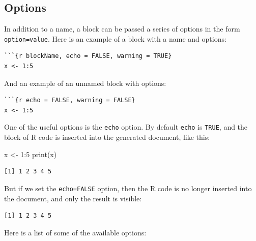 \documentclass[
  letterpaper,
  DIV=11,
  numbers=noendperiod]{scrreprt}
\newenvironment{Shaded}{\begin{snugshade}}{\end{snugshade}}
\newcommand{\DecValTok}[1]{\textcolor[rgb]{0.68,0.00,0.00}{#1}}
\newcommand{\FunctionTok}[1]{\textcolor[rgb]{0.28,0.35,0.67}{#1}}
\newcommand{\NormalTok}[1]{\textcolor[rgb]{0.00,0.23,0.31}{#1}}
\newcommand{\OtherTok}[1]{\textcolor[rgb]{0.00,0.23,0.31}{#1}}
\newcommand{\SpecialCharTok}[1]{\textcolor[rgb]{0.37,0.37,0.37}{#1}}
\begin{document}
\subsection{Options}\label{options}

In addition to a name, a block can be passed a series of options in the
form \texttt{option=value}. Here is an example of a block with a name
and options:

\begin{verbatim}
```{r blockName, echo = FALSE, warning = TRUE}
x <- 1:5
\end{verbatim}

And an example of an unnamed block with options:

\begin{verbatim}
```{r echo = FALSE, warning = FALSE}
x <- 1:5
\end{verbatim}

One of the useful options is the \texttt{echo} option. By default
\texttt{echo} is \texttt{TRUE}, and the block of R code is inserted into
the generated document, like this:

\begin{Shaded}
\begin{Highlighting}[]
\NormalTok{x }\OtherTok{\textless{}{-}} \DecValTok{1}\SpecialCharTok{:}\DecValTok{5}
\FunctionTok{print}\NormalTok{(x)}
\end{Highlighting}
\end{Shaded}

\begin{verbatim}
[1] 1 2 3 4 5
\end{verbatim}

But if we set the \texttt{echo=FALSE} option, then the R code is no
longer inserted into the document, and only the result is visible:

\begin{verbatim}
[1] 1 2 3 4 5
\end{verbatim}

Here is a list of some of the available options:
\end{document}
